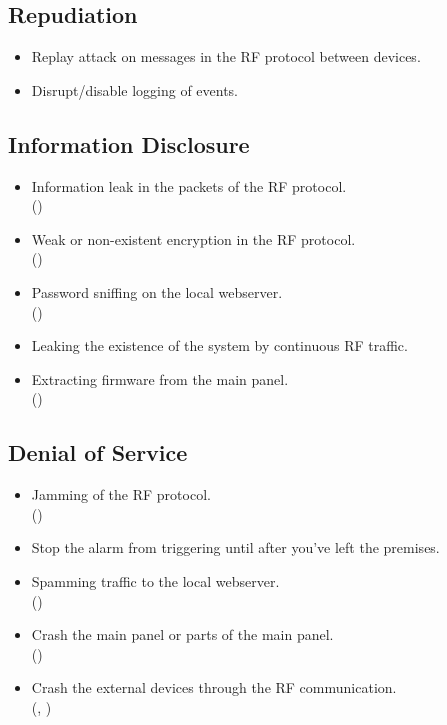 \subsection{Repudiation}
\begin{itemize}
    \item Replay attack on messages in the RF protocol between devices.
    \item Disrupt/disable logging of events.
\end{itemize}

\subsection{Information Disclosure}
\begin{itemize}
    \item Information leak in the packets of the \gls{RF} protocol.
    \\ ()
    \item Weak or non-existent encryption in the \gls{RF} protocol.
    \\ ()
    \item Password sniffing on the local webserver.
    \\ ()
    \item Leaking the existence of the system by continuous RF traffic.
    \item Extracting firmware from the main panel.
    \\ ()
\end{itemize}

\subsection{Denial of Service}
\begin{itemize}
    \item Jamming of the RF protocol.
    \\ ()
    \item Stop the alarm from triggering until after you've left the premises.
    \item Spamming traffic to the local webserver.
    \\ ()
    \item Crash the main panel or parts of the main panel.
    \\ ()
    \item Crash the external devices through the RF communication.
    \\ (, )
\end{itemize}

